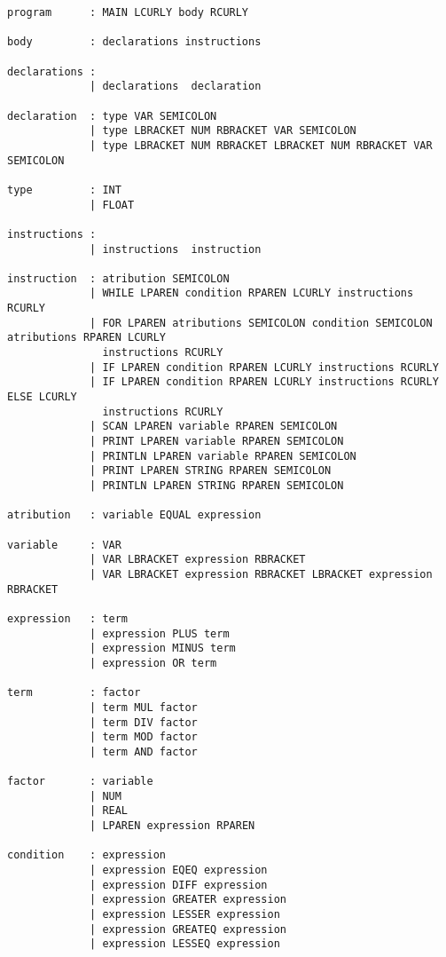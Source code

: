 \documentclass[11pt,a4paper]{report}%
\begin{document}
\begin{verbatim}
program      : MAIN LCURLY body RCURLY

body         : declarations instructions

declarations : 
             | declarations  declaration

declaration  : type VAR SEMICOLON
             | type LBRACKET NUM RBRACKET VAR SEMICOLON
             | type LBRACKET NUM RBRACKET LBRACKET NUM RBRACKET VAR SEMICOLON

type         : INT
             | FLOAT

instructions :
             | instructions  instruction

instruction  : atribution SEMICOLON
             | WHILE LPAREN condition RPAREN LCURLY instructions RCURLY
             | FOR LPAREN atributions SEMICOLON condition SEMICOLON atributions RPAREN LCURLY 
               instructions RCURLY
             | IF LPAREN condition RPAREN LCURLY instructions RCURLY
             | IF LPAREN condition RPAREN LCURLY instructions RCURLY ELSE LCURLY 
               instructions RCURLY
             | SCAN LPAREN variable RPAREN SEMICOLON
             | PRINT LPAREN variable RPAREN SEMICOLON
             | PRINTLN LPAREN variable RPAREN SEMICOLON
             | PRINT LPAREN STRING RPAREN SEMICOLON
             | PRINTLN LPAREN STRING RPAREN SEMICOLON

atribution   : variable EQUAL expression 

variable     : VAR
             | VAR LBRACKET expression RBRACKET
             | VAR LBRACKET expression RBRACKET LBRACKET expression RBRACKET

expression   : term
             | expression PLUS term
             | expression MINUS term
             | expression OR term
             
term         : factor
             | term MUL factor
             | term DIV factor
             | term MOD factor
             | term AND factor

factor       : variable
             | NUM
             | REAL
             | LPAREN expression RPAREN

condition    : expression
             | expression EQEQ expression
             | expression DIFF expression
             | expression GREATER expression
             | expression LESSER expression
             | expression GREATEQ expression
             | expression LESSEQ expression
\end{verbatim}
\end{document}
